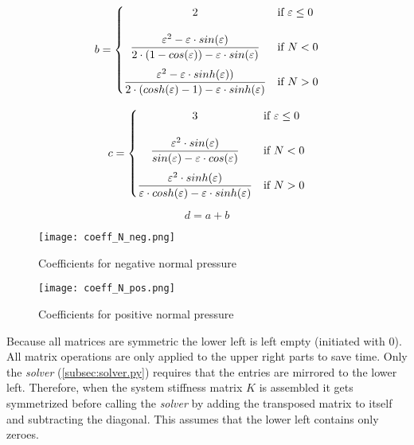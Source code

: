 \begin{equation} \label{b}
    b = \begin{cases}
            \hfil 2              & \text{if } \varepsilon \leq 0\\[1.2em]
            \hfil \dfrac{\varepsilon^2 - \varepsilon \cdot sin(\varepsilon)}{2\cdot(1 - cos(\varepsilon)) - \varepsilon \cdot sin(\varepsilon) }               & \text{if } N < 0          \\[1.2em]
            \dfrac{\varepsilon^2 - \varepsilon \cdot sinh(\varepsilon))}{2 \cdot (cosh(\varepsilon) - 1) - \varepsilon \cdot sinh(\varepsilon)}               & \text{if } N > 0
        \end{cases}
\end{equation}

\begin{equation} \label{c}
    c = \begin{cases}
            \hfil 3              & \text{if } \varepsilon \leq 0\\[1.2em]
            \hfil \dfrac{\varepsilon^2 \cdot sin(\varepsilon)}{sin(\varepsilon) - \varepsilon \cdot cos(\varepsilon)}               & \text{if } N < 0          \\[1.2em]
            \dfrac{\varepsilon^2 \cdot sinh(\varepsilon)}{\varepsilon \cdot cosh(\varepsilon) - \varepsilon \cdot sinh(\varepsilon)}               & \text{if } N > 0
        \end{cases}
\end{equation}

\begin{equation} \label{d}
    d = a + b
\end{equation}

\begin{figure}[h]%
    \centering
    \texttt{[image: coeff\_N\_neg.png]}%
    \caption{Coefficients for negative normal pressure}%
    \label{fig:coeff_N_neg}%
\end{figure}

\begin{figure}[h]%
    \centering
    \texttt{[image: coeff\_N\_pos.png]}%
    \caption{Coefficients for positive normal pressure}%
    \label{fig:coeff_N_pos}%
\end{figure}

Because all matrices are symmetric the lower left is left empty (initiated with $0$). All matrix operations are only applied to the upper right parts to save time.
Only the \textit{solver} (\cref{subsec:solver.py}) requires that the entries are mirrored to the lower left. Therefore, when the system stiffness matrix $K$ is assembled it gets symmetrized before calling the \textit{solver} by adding the transposed matrix to itself and subtracting the diagonal.
This assumes that the lower left contains only zeroes.

